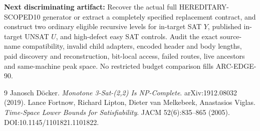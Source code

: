 \documentclass[11pt]{article}
\begin{document}
\textbf{Next discriminating artifact:} Recover the actual full HEREDITARY-SCOPED10 generator or extract a completely specified replacement contract, and construct two ordinary eligible recursive levels for in-target SAT $Y$, published in-target UNSAT $U$, and high-defect easy SAT controls. Audit the exact source-name compatibility, invalid child adapters, encoded header and body lengths, paid discovery and reconstruction, bit-local access, failed routes, live ancestors and same-machine peak space. No restricted budget comparison fills ARC-EDGE-90.

\begin{thebibliography}{9}
 Janosch D\"ocker. \emph{Monotone 3-Sat-(2,2) Is NP-Complete}. arXiv:1912.08032 (2019).
 Lance Fortnow, Richard Lipton, Dieter van Melkebeek, Anastasios Viglas. \emph{Time-Space Lower Bounds for Satisfiability}. JACM 52(6):835--865 (2005). DOI:10.1145/1101821.1101822.
\end{thebibliography}
\end{document}
